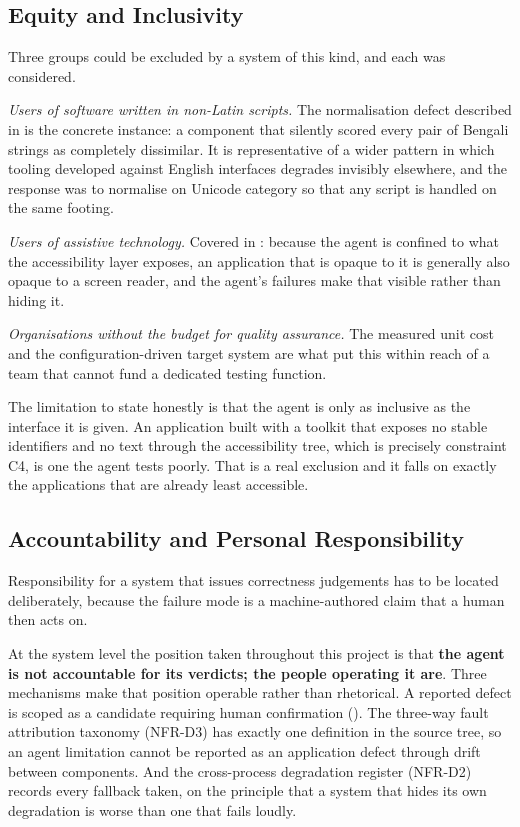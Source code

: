 \subsection{Equity and Inclusivity}
\label{sec:equity}

Three groups could be excluded by a system of this kind, and each was
considered.

\emph{Users of software written in non-Latin scripts.} The normalisation defect
described in  is the concrete instance: a component that
silently scored every pair of Bengali strings as completely dissimilar. It is
representative of a wider pattern in which tooling developed against English
interfaces degrades invisibly elsewhere, and the response was to normalise on
Unicode category so that any script is handled on the same footing.

\emph{Users of assistive technology.} Covered in : because
the agent is confined to what the accessibility layer exposes, an application
that is opaque to it is generally also opaque to a screen reader, and the
agent's failures make that visible rather than hiding it.

\emph{Organisations without the budget for quality assurance.} The measured
unit cost and the configuration-driven target system are what put this within
reach of a team that cannot fund a dedicated testing function.

The limitation to state honestly is that the agent is only as inclusive as the
interface it is given. An application built with a toolkit that exposes no
stable identifiers and no text through the accessibility tree, which is
precisely constraint C4, is one the agent tests poorly. That is a real
exclusion and it falls on exactly the applications that are already least
accessible.

\subsection{Accountability and Personal Responsibility}
\label{sec:accountability}

Responsibility for a system that issues correctness judgements has to be
located deliberately, because the failure mode is a machine-authored claim that
a human then acts on.

At the system level the position taken throughout this project is that
\textbf{the agent is not accountable for its verdicts; the people operating it
are}. Three mechanisms make that position operable rather than rhetorical. A
reported defect is scoped as a candidate requiring human confirmation
(). The three-way fault attribution taxonomy (NFR-D3) has
exactly one definition in the source tree, so an agent limitation cannot be
reported as an application defect through drift between components. And the
cross-process degradation register (NFR-D2) records every fallback taken, on
the principle that a system that hides its own degradation is worse than one
that fails loudly.


